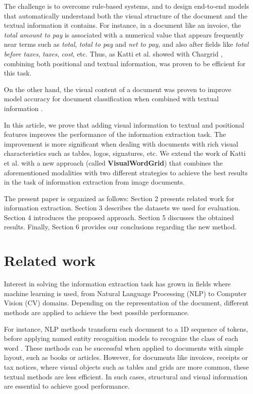 \documentclass[conference]{IEEEtran}
\begin{document}
The challenge is to overcome rule-based systems, and to design end-to-end models that automatically understand both the visual structure of the document and the textual information it contains. For instance, in a document like an invoice, the \textit{total amount to pay} is associated with a numerical value that appears frequently near terms such as \textit{total}, \textit{total to pay} and \textit{net to pay}, and also after fields like \textit{total before taxes}, \textit{taxes}, \textit{cost}, etc. Thus, as Katti et al. showed with Chargrid \cite{chargrid}, combining both positional and textual information, was proven to be efficient for this task. 

On the other hand, the visual content of a document was proven to improve  model accuracy for document classification when combined with textual information \cite{kuider}.

In this article, we prove that adding visual information to textual and positional features improves the performance of the information extraction task.
The improvement is more significant when dealing with documents with rich visual characteristics such as tables, logos, signatures, etc. 
We extend the work of Katti et al. \cite{chargrid, bertgrid} with a new approach (called \textbf{VisualWordGrid}) that combines the aforementioned modalities with two different strategies to achieve the best results in the task of information extraction from image documents.

The present paper is organized as follows: Section 2 presents related work for information extraction. Section 3 describes the datasets we used for evaluation. Section 4 introduces the proposed approach. Section 5 discusses the obtained results. Finally, Section 6 provides our conclusions regarding the new method.

\section{Related work}
Interest in solving the information extraction task has grown in fields where machine learning is used, from Natural Language Processing (NLP) to Computer Vision (CV) domains. Depending on the representation of the document, different methods are applied to achieve the best possible performance. 

For instance, NLP methods transform each document to a 1D sequence of tokens, before applying named entity recognition models to recognize the class of each word \cite{ner}. These methods can be successful when applied to documents with simple layout, such as books or articles. However, for documents like invoices, receipts or tax notices, where visual objects such as tables and grids are more common, these textual methods are less efficient. 
In such cases, structural and visual information are essential to achieve good  performance.
\end{document}
